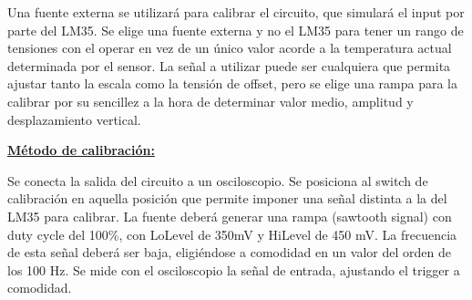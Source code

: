 \documentclass[../../main.tex]{subfiles}
\begin{document}
Una fuente externa se utilizará para calibrar el circuito, que simulará el input por parte del LM35. Se elige una fuente externa y no el LM35 para tener un rango de tensiones con el operar en vez de un único valor acorde a la temperatura actual determinada por el sensor. La señal a utilizar puede ser cualquiera que permita ajustar tanto la escala como la tensión de offset, pero se elige una rampa para la calibrar por su sencillez a la hora de determinar valor medio, amplitud y desplazamiento vertical.\par

\textbf{\underline{Método de calibración:}} 

Se conecta la salida del circuito a un osciloscopio.  
Se posiciona al switch de calibración en aquella posición que permite imponer una señal distinta a la del LM35 para calibrar. La fuente deberá generar una rampa (sawtooth signal) con duty cycle del 100\%, con LoLevel de 350mV y HiLevel de 450 mV. La frecuencia de esta señal deberá ser baja, eligiéndose a comodidad en un valor del orden de los 100 Hz. Se mide con el osciloscopio la señal de entrada, ajustando el trigger a comodidad.\par 
\end{document}
